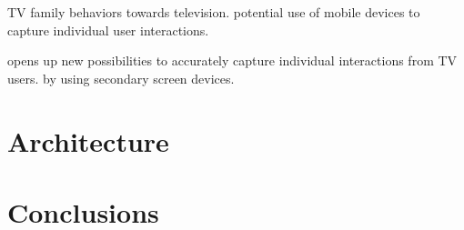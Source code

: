 \documentclass[conference,a4paper]{IEEEtran}
\begin{document}
TV family behaviors towards television.
potential use of mobile devices to capture individual user interactions.

opens up new possibilities to accurately capture individual interactions from TV users. by using secondary screen devices.

\section{Architecture}

\section{Conclusions}



\end{document}
